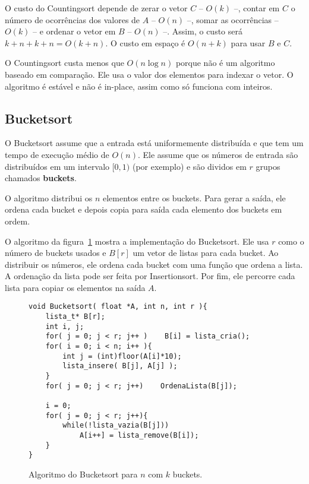 O custo do Countingsort depende de zerar o vetor $C$ -- $O(k)$ --, 
contar em $C$ o número de ocorrências dos valores de $A$ -- $O(n)$ --,
somar as ocorrências -- $O(k)$ -- e ordenar o vetor em $B$ -- $O(n)$ --.
Assim, o custo será $k + n + k + n = O(k + n)$.
O custo em espaço é $O(n + k)$ para usar $B$ e $C$.

O Countingsort custa menos que $O(n \log n)$ porque não é um algoritmo baseado
em comparação.  Ele usa o valor dos elementos para indexar o vetor.
O algoritmo é estável e não é in-place, assim como só funciona com inteiros.

\subsection{Bucketsort}

O Bucketsort assume que a entrada está uniformemente distribuída e que tem um
tempo de execução médio de $O(n)$.
Ele assume que os números de entrada são distribuídos em um intervalo $[0,1)$ (por exemplo)
e são dividos em $r$ grupos chamados {\bf buckets}.

O algoritmo distribui os $n$ elementos entre os buckets.
Para gerar a saída, ele ordena cada bucket e depois copia para saída 
cada elemento dos buckets em ordem.

O algoritmo da figura~\ref{aula03:algo:bucket} mostra a implementação do
Bucketsort.
Ele usa $r$ como o número de buckets usados e $B[r]$ um vetor de listas para
cada bucket.
Ao distribuir os números, ele ordena cada bucket com uma função
que ordena a lista. A ordenação da lista pode ser feita por
Insertionsort.
Por fim, ele percorre cada lista para copiar os elementos na saída $A$.
%
\begin{figure}[!htb]
\centering
\begin{framed}
\begin{lstlisting}
void Bucketsort( float *A, int n, int r ){
	lista_t* B[r];
	int i, j;
	for( j = 0; j < r; j++ )    B[i] = lista_cria();
	for( i = 0; i < n; i++ ){
		int j = (int)floor(A[i]*10);
		lista_insere( B[j], A[j] );
	}
	for( j = 0; j < r; j++)    OrdenaLista(B[j]);

	i = 0;
	for( j = 0; j < r; j++){
		while(!lista_vazia(B[j]))
			A[i++] = lista_remove(B[i]);
	}
}
\end{lstlisting}
\end{framed}
\caption{Algoritmo do Bucketsort para $n$ com $k$ buckets.}
\label{aula03:algo:bucket}
\end{figure}

